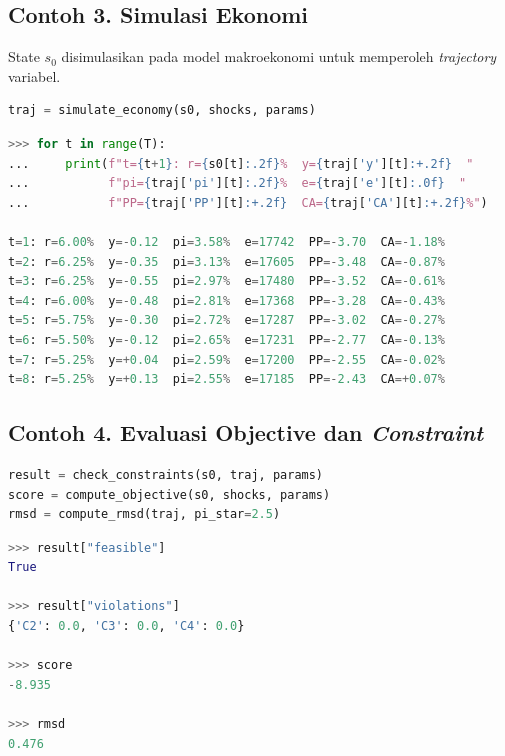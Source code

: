 \subsection*{Contoh 3. Simulasi Ekonomi}

State $s_0$ disimulasikan pada model makroekonomi untuk memperoleh \textit{trajectory} variabel.

\begin{tcolorbox}[title=Input]
    \begin{lstlisting}[language=Python]
traj = simulate_economy(s0, shocks, params)
\end{lstlisting}
\end{tcolorbox}

\begin{tcolorbox}[title=Output]
    \begin{lstlisting}[language=Python, basicstyle=\ttfamily\tiny]
>>> for t in range(T):
...     print(f"t={t+1}: r={s0[t]:.2f}%  y={traj['y'][t]:+.2f}  "
...           f"pi={traj['pi'][t]:.2f}%  e={traj['e'][t]:.0f}  "
...           f"PP={traj['PP'][t]:+.2f}  CA={traj['CA'][t]:+.2f}%")

t=1: r=6.00%  y=-0.12  pi=3.58%  e=17742  PP=-3.70  CA=-1.18%
t=2: r=6.25%  y=-0.35  pi=3.13%  e=17605  PP=-3.48  CA=-0.87%
t=3: r=6.25%  y=-0.55  pi=2.97%  e=17480  PP=-3.52  CA=-0.61%
t=4: r=6.00%  y=-0.48  pi=2.81%  e=17368  PP=-3.28  CA=-0.43%
t=5: r=5.75%  y=-0.30  pi=2.72%  e=17287  PP=-3.02  CA=-0.27%
t=6: r=5.50%  y=-0.12  pi=2.65%  e=17231  PP=-2.77  CA=-0.13%
t=7: r=5.25%  y=+0.04  pi=2.59%  e=17200  PP=-2.55  CA=-0.02%
t=8: r=5.25%  y=+0.13  pi=2.55%  e=17185  PP=-2.43  CA=+0.07%
\end{lstlisting}
\end{tcolorbox}

\subsection*{Contoh 4. Evaluasi Objective dan \textit{Constraint}}

\begin{tcolorbox}[title=Input]
    \begin{lstlisting}[language=Python]
result = check_constraints(s0, traj, params)
score = compute_objective(s0, shocks, params)
rmsd = compute_rmsd(traj, pi_star=2.5)
\end{lstlisting}
\end{tcolorbox}

\begin{tcolorbox}[title=Output]
    \begin{lstlisting}[language=Python]
>>> result["feasible"]
True

>>> result["violations"]
{'C2': 0.0, 'C3': 0.0, 'C4': 0.0}

>>> score
-8.935

>>> rmsd
0.476
\end{lstlisting}
\end{tcolorbox}

